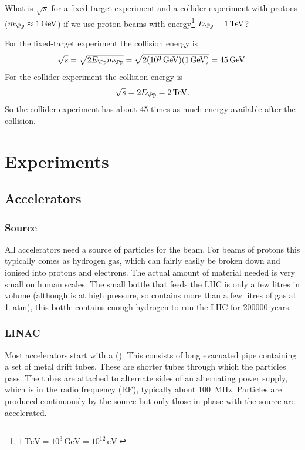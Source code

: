 \documentclass[fleqn]{NotesClass}
\begin{document}
    \begin{exm}{}{}
        What is \(\sqrt{s}\) for a fixed-target experiment and a collider experiment with protons (\(m_{\Pp} \approx \qty{1}{\giga\electronvolt}\)) if we use proton beams with energy\footnote{\(\qty{1}{\tera\electronvolt} = 10^3\,\unit{\giga\electronvolt} = 10^{12}\,\unit{\electronvolt}\).} \(E_{\Pp} = \qty{1}{\tera\electronvolt}\)?
        
        For the fixed-target experiment the collision energy is
        \begin{equation}
            \sqrt{s} = \sqrt{2E_{\Pp}m_{\Pp}} = \sqrt{2(10^3\,\unit{\giga\electronvolt})(\qty{1}{\giga\electronvolt})} = \qty{45}{\giga\electronvolt}.
        \end{equation}
        For the collider experiment the collision energy is
        \begin{equation}
            \sqrt{s} = 2E_{\Pp} = \qty{2}{\tera\electronvolt}.
        \end{equation}
        So the collider experiment has about 45 times as much energy available after the collision.
    \end{exm}
    
    \part{Experiments}
    \chapter{Accelerators}
    \section{Source}
    All accelerators need a source of particles for the beam.
    For beams of protons this typically comes as hydrogen gas, which can fairly easily be broken down and ionised into protons and electrons.
    The actual amount of material needed is very small on human scales.
    The small bottle that feeds the LHC is only a few litres in volume (although is at high pressure, so contains more than a few litres of gas at \qty{1}{atm}), this bottle contains enough hydrogen to run the LHC for \num{200000} years.
    
    \section{LINAC}
    Most accelerators start with a  ().
    This consists of long evacuated pipe containing a set of metal drift tubes.
    These are shorter tubes through which the particles pass.
    The tubes are attached to alternate sides of an alternating power supply, which is in the radio frequency (RF), typically about \qty{100}{\mega\hertz}.
    Particles are produced continuously by the source but only those in phase with the source are accelerated.
    
\end{document}
